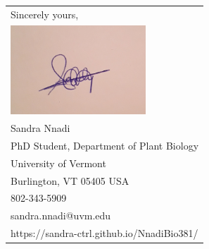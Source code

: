 \documentclass[10pt]{article}\usepackage[]{graphicx}\usepackage[]{color}
\begin{document}


\begin{tabular}{@{}l}
Sincerely yours,\\
\includegraphics[scale=0.15,width=2in]{SandraSignature.jpg}\\
Sandra Nnadi\\
PhD Student, Department of Plant Biology\\
University of Vermont\\
Burlington, VT 05405 USA\\
802-343-5909\\
sandra.nnadi@uvm.edu\\
https://sandra-ctrl.github.io/NnadiBio381/\\
\end{tabular}
\end{document}
